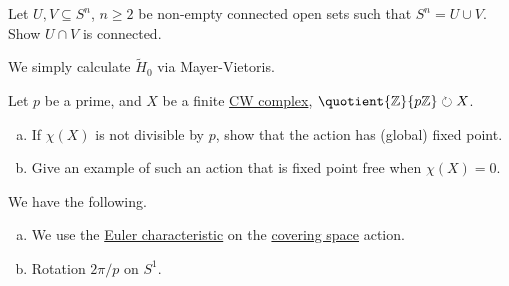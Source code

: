 \begin{exercise}[QR Jan. 2016]
	Let \(U, V\subseteq S^n\), \(n \geq 2\) be non-empty connected open sets such that \(S^n = U \cup V\). Show \(U \cap V\) is
	connected.
\end{exercise}
\begin{answer}
	We simply calculate \(\widetilde{H} _0\) via Mayer-Vietoris.
\end{answer}

\begin{exercise}[QR Jan. 2016]
	Let \(p\) be a prime, and \(X\) be a finite \hyperref[def:CW-Complex]{CW complex}, \(\quotient{\mathbb{\MakeUppercase{z}} }{p \mathbb{\MakeUppercase{z}} }\circlearrowright X \).

	\begin{enumerate}[(a)]
		\item If \(\chi (X)\) is not divisible by \(p\), show that the action has (global) fixed point.
		\item Give an example of such an action that is fixed point free when \(\chi (X) = 0\).
	\end{enumerate}
\end{exercise}
\begin{answer}
	We have the following.
	\begin{enumerate}[(a)]
		\item We use the \hyperref[def:Euler-characteristic]{Euler characteristic} on the \hyperref[def:covering-space]{covering space} action.
		\item Rotation \(2\pi / p\) on \(S^1\).
	\end{enumerate}
\end{answer}